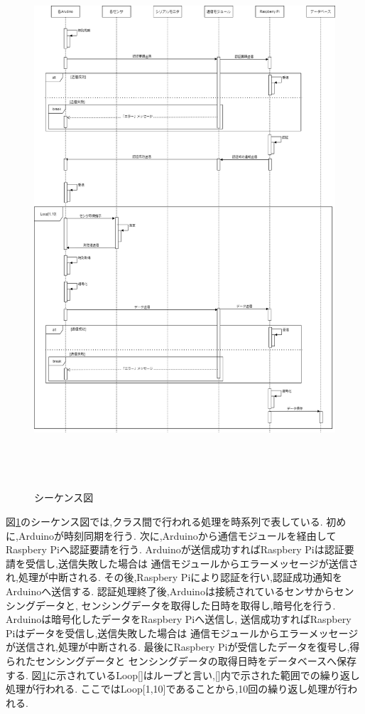 \begin{figure}[H]
\begin{center}
	\includegraphics[height=200mm]{kihon_sequence.png}
	\caption{シーケンス図}
	\label{fig:kihon_sequence}
\end{center}
\end{figure}
図\ref{fig:kihon_sequence}のシーケンス図では,クラス間で行われる処理を時系列で表している.
初めに,Arduinoが時刻同期を行う.
次に,Arduinoから通信モジュールを経由してRaspbery Piへ認証要請を行う.
Arduinoが送信成功すればRaspbery Piは認証要請を受信し,送信失敗した場合は
通信モジュールからエラーメッセージが送信され,処理が中断される.
その後,Raspbery Piにより認証を行い,認証成功通知をArduinoへ送信する.
認証処理終了後,Arduinoは接続されているセンサからセンシングデータと,
センシングデータを取得した日時を取得し,暗号化を行う.
Arduinoは暗号化したデータをRaspbery Piへ送信し,
送信成功すればRaspbery Piはデータを受信し,送信失敗した場合は
通信モジュールからエラーメッセージが送信され,処理が中断される.
最後にRaspbery Piが受信したデータを復号し,得られたセンシングデータと
センシングデータの取得日時をデータベースへ保存する.
図\ref{fig:kihon_sequence}に示されているLoop[]はループと言い,[]内で示された範囲での繰り返し処理が行われる.
ここではLoop[1,10]であることから,10回の繰り返し処理が行われる.

